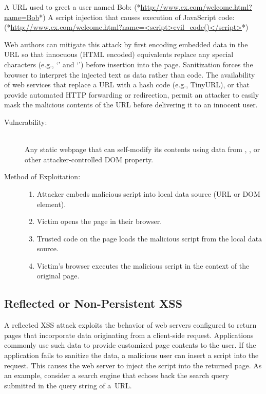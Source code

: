 \begin{exploit-example}
A URL used to greet a user named Bob:
(*\url{http://www.ex.com/welcome.html?name=Bob}*)
A script injection that causes execution of JavaScript code:
(*\url{http://www.ex.com/welcome.html?name=<script>evil_code()</script>}*)
\end{exploit-example}

Web authors can mitigate this attack by first encoding embedded data in the URL so that innocuous (HTML encoded) equivalents replace any special characters (e.g., `\code{<}' and `\code{>}') before insertion into the page.
Sanitization forces the browser to interpret the injected text as data rather than code.
The availability of web services that replace a URL with a hash code (e.g., TinyURL), or that provide automated HTTP forwarding or redirection, permit an attacker to easily mask the malicious contents of the URL before delivering it to an innocent user.

\begin{description}
 \item[Vulnerability:] \hfill \\
   Any static webpage that can self-modify its contents using data from , ,  or other attacker-controlled DOM property.
 \item[Method of Exploitation:] \hfill
  \begin{enumerate}
   \item Attacker embeds malicious script into local data source (URL or DOM element).
   \item Victim opens the page in their browser.
   \item Trusted code on the page loads the malicious script from the local data source.
   \item Victim's browser executes the malicious script in the context of the original page.
  \end{enumerate}
\end{description}

\subsection{Reflected or Non-Persistent XSS}\label{sec:xss-types-reflected}

A reflected XSS attack exploits the behavior of web servers configured to return pages that incorporate data originating from a client-side request.
Applications commonly use such data to provide customized page contents to the user.
If the application fails to sanitize the data, a malicious user can insert a script into the request.
This causes the web server to inject the script into the returned page.
As an example, consider a search engine that echoes back the search query submitted in the query string of a~URL.

